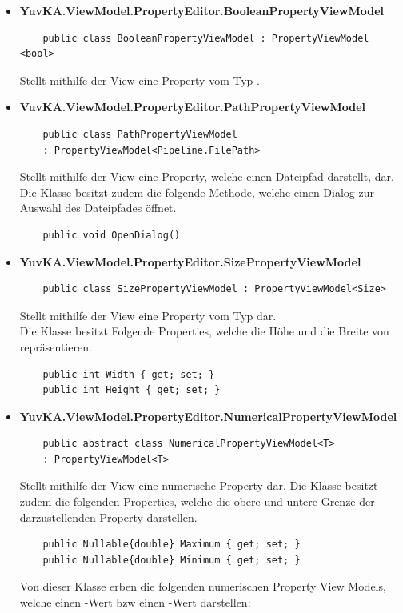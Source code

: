 \begin{itemize}

\item{\textbf{YuvKA.ViewModel.PropertyEditor.BooleanPropertyViewModel\\}}
	\begin{verbatim}
	public class BooleanPropertyViewModel : PropertyViewModel <bool>
	\end{verbatim}
	Stellt mithilfe der View eine Property vom Typ .

\item{\textbf{VuvKA.ViewModel.PropertyEditor.PathPropertyViewModel\\}}
	\begin{verbatim}
	public class PathPropertyViewModel 
	: PropertyViewModel<Pipeline.FilePath>
	\end{verbatim}
	Stellt mithilfe der View eine Property, welche einen Dateipfad darstellt, dar.\\
	Die Klasse besitzt zudem die folgende Methode, welche einen Dialog zur Auswahl des Dateipfades öffnet.
	\begin{verbatim}
	public void OpenDialog()
	\end{verbatim}

\item{\textbf{YuvKA.ViewModel.PropertyEditor.SizePropertyViewModel\\}}
	\begin{verbatim}
	public class SizePropertyViewModel : PropertyViewModel<Size>
	\end{verbatim}
	Stellt mithilfe der View eine Property vom Typ  dar.\\
	Die Klasse besitzt Folgende Properties, welche die Höhe und die Breite von  repräsentieren.
	\begin{verbatim}
	public int Width { get; set; }
	public int Height { get; set; } 
	\end{verbatim}

\item{\textbf{YuvKA.ViewModel.PropertyEditor.NumericalPropertyViewModel\\}}
	\begin{verbatim}
	public abstract class NumericalPropertyViewModel<T> 
	: PropertyViewModel<T>
	\end{verbatim}
	Stellt mithilfe der View eine numerische Property dar. Die Klasse besitzt zudem die folgenden Properties, welche die obere und untere Grenze der darzustellenden Property darstellen.
	\begin{verbatim}
	public Nullable{double} Maximum { get; set; }
	public Nullable{double} Minimum { get; set; }
	\end{verbatim}
	Von dieser Klasse erben die folgenden numerischen Property View Models, welche einen -Wert bzw einen -Wert darstellen:


\end{itemize}
